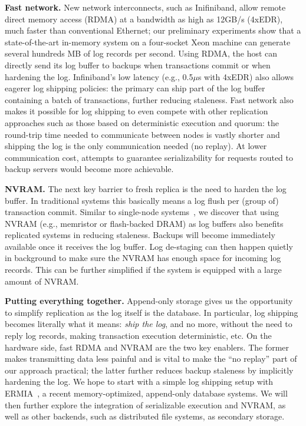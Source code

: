 \documentclass[10pt]{article}
\begin{document}
\textbf{Fast network.} New network interconnects, such as Inifiniband, allow remote direct memory access (RDMA) at a bandwidth as high as 12GB/s (4xEDR), much faster than conventional Ethernet; our preliminary experiments show that a state-of-the-art in-memory system on a four-socket Xeon machine can generate several hundreds MB of log records per second. Using RDMA, the host can directly send its log buffer to backups when transactions commit or when hardening the log. Infiniband's low latency (e.g., 0.5$\mu$s with 4xEDR) also allows eagerer log shipping policies: the primary can ship part of the log buffer containing a batch of transactions, further reducing staleness. Fast network also makes it possible for log shipping to even compete with other replication approaches such as those based on deterministic execution and quorum: the round-trip time needed to communicate between nodes is vastly shorter and shipping the log is the only communication needed (no replay). At lower communication cost, attempts to guarantee serializability for requests routed to backup servers would become more achievable.

\textbf{NVRAM.} The next key barrier to fresh replica is the need to harden the log buffer. In traditional systems this basically means a log flush per (group of) transaction commit. Similar to single-node systems~\cite{NVM-DLog}, we discover that using NVRAM (e.g., memristor or flash-backed DRAM) as log buffers also benefits replicated systems in reducing staleness. Backups will become immediately available once it receives the log buffer. Log de-staging can then happen quietly in background to make sure the NVRAM has enough space for incoming log records. This can be further simplified if the system is equipped with a large amount of NVRAM.

\textbf{Putting everything together.} Append-only storage gives us the opportunity to simplify replication as the log itself is the database. In particular, log shipping becomes literally what it means: \textit{ship the log}, and no more, without the need to reply log records, making transaction execution deterministic, etc. On the hardware side, fast RDMA and NVRAM are the two key enablers. The former makes transmitting data less painful and is vital to make the ``no replay'' part of our approach practical; the latter further reduces backup staleness by implicitly hardening the log. We hope to start with a simple log shipping setup with ERMIA~\cite{ERMIA}, a recent memory-optimized, append-only database systems. We will then further explore the integration of serializable execution and NVRAM, as well as other backends, such as distributed file systems, as secondary storage.
\renewcommand{\refname}{}\vspace{-12mm}

\setlength{\bibsep}{3pt plus 0ex}

\end{document}
